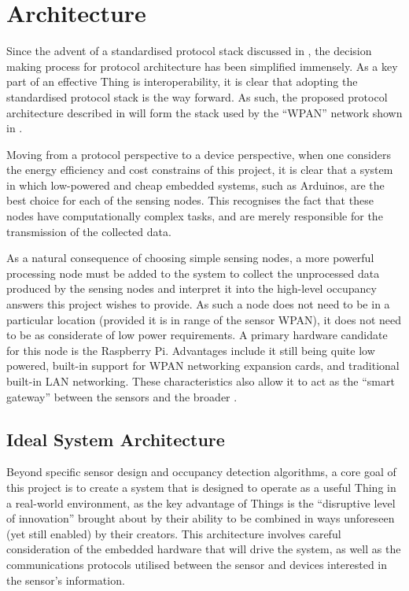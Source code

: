 \documentclass[../thesis/thesis.tex]{subfiles}
\begin{document}
\chapter{Architecture}

Since the advent of a standardised \iot protocol stack discussed in , the decision making process for protocol architecture has been simplified immensely. As a key part of an effective Thing is interoperability, it is clear that adopting the standardised protocol stack is the way forward. As such, the proposed protocol architecture described in  will form the stack used by the ``WPAN'' network shown in .

Moving from a protocol perspective to a device perspective, when one considers the energy efficiency and cost constrains of this project, it is clear that a system in which low-powered and cheap embedded systems, such as Arduinos, are the best choice for each of the sensing nodes. This recognises the fact that these nodes have computationally complex tasks, and are merely responsible for the transmission of the collected data.

As a natural consequence of choosing simple sensing nodes, a more powerful processing node must be added to the system to collect the unprocessed data produced by the sensing nodes and interpret it into the high-level occupancy answers this project wishes to provide. As such a node does not need to be in a particular location (provided it is in range of the sensor WPAN), it does not need to be as considerate of low power requirements. A primary hardware candidate for this node is the Raspberry Pi. Advantages include it still being quite low powered, built-in support for WPAN networking expansion cards, and traditional built-in LAN networking. These characteristics also allow it to act as the ``smart gateway'' between the sensors and the broader \iot.



\section{Ideal System Architecture}
\label{sec:litreview:architecture}
Beyond specific sensor design and occupancy detection algorithms, a core goal of this project is to create a system that is designed to operate as a useful Thing in a real-world \iot environment, as the key advantage of Things is the ``disruptive level of innovation''\cite{atzori2010internet} brought about by their ability to be combined in ways unforeseen (yet still enabled) by their creators. This architecture involves careful consideration of the embedded hardware that will drive the system, as well as the communications protocols utilised between the sensor and devices interested in the sensor's information.
\end{document}
